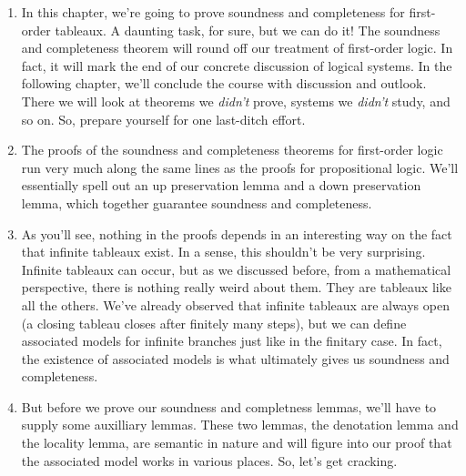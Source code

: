 	\begin{enumerate}[\thesection.1]

		\item In this chapter, we're going to prove soundness
                  and completeness for first-order tableaux. A
                  daunting task, for sure, but we can do it! The
                  soundness and completeness theorem will round off
                  our treatment of first-order logic. In fact, it will
                  mark the end of our concrete discussion of logical
                  systems. In the following chapter, we'll conclude
                  the course with discussion and outlook. There we
                  will look at theorems we \emph{didn't} prove,
                  systems we \emph{didn't} study, and so on. So,
                  prepare yourself for one last-ditch effort.

                 \item The proofs of the soundness and completeness
                   theorems for first-order logic run very much along
                   the same lines as the proofs for propositional
                   logic. We'll essentially spell out an up
                   preservation lemma and a down preservation lemma,
                   which together guarantee soundness and completeness.
                   
                 \item As you'll see, nothing in the proofs depends in
                   an interesting way on the fact that infinite
                   tableaux exist. In a sense, this shouldn't be very
                   surprising. Infinite tableaux can occur, but as we
                   discussed before, from a mathematical perspective,
                   there is nothing really weird about them. They are
                   tableaux like all the others. We've  already
                   observed that infinite tableaux are always
                   open (a closing tableau closes after finitely many
                   steps), but we can define associated models for
                   infinite branches just like in the finitary
                   case. In fact, the existence of associated models
                   is what ultimately gives us soundness and
                   completeness.

                   \item But before we prove our soundness and
                     completness lemmas, we'll have to supply some
                     auxilliary lemmas. These two lemmas, the
                     denotation lemma and the locality lemma, are
                     semantic in nature and will figure into our proof
                     that the associated model works in various
                     places. So, let's get cracking.

		
	\end{enumerate}
	
